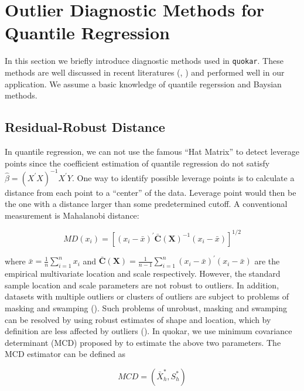 \documentclass[11pt,a4paper,]{article}
\theoremstyle{definition}
\theoremstyle{definition}
\theoremstyle{remark}
\begin{document}
\section{Outlier Diagnostic Methods for Quantile
Regression}\label{outlier-diagnostic-methods-for-quantile-regression}

In this section we briefly introduce diagnostic methods used in
\texttt{quokar}. These methods are well discussed in recent literatures
(\textcite{sanchez2013likelihood}, \textcite{santos2016bayesian}) and
performed well in our application. We assume a basic knowledge of
quantile regerssion and Baysian methods.

\subsection{Residual-Robust Distance}\label{residual-robust-distance}

In quantile regression, we can not use the famous ``Hat Matrix'' to
detect leverage points since the coefficient estimation of quantile
regression do not satisfy \(\hat{\beta}=(X^{'}X)^{-1}X^{'}Y\). One way
to identify possible leverage points is to calculate a distance from
each point to a ``center'' of the data. Leverage point would then be the
one with a distance larger than some predetermined cutoff. A
conventional measurement is Mahalanobi distance:

\begin{equation}
MD(x_i) = [(x_i-\bar{x})^{'}\bar{\boldsymbol{C}}(\boldsymbol{X})^{-1}(x_i-\bar{x})]^{1/2}
\label{eq:distance}
\end{equation}

where \(\bar{x}=\frac{1}{n}\sum_{i=1}^{n}x_i\) and
\(\bar{\boldsymbol{C}}(\boldsymbol{X})=\frac{1}{n-1}\sum_{i=1}^{n}(x_i-\bar{x})^{'}(x_i-\bar{x})\)
are the empirical multivariate location and scale respectively. However,
the standard sample location and scale parameters are not robust to
outliers. In addition, datasets with multiple outliers or clusters of
outliers are subject to problems of masking and swamping
(\textcite{pearson1936efficiency}). Such problems of unrobust, masking
and swamping can be resolved by using robust estimates of shape and
location, which by definition are less affected by outliers
(\textcite{rousseeuw1991robust}). In quokar, we use minimum covariance
determinant (MCD) proposed by \textcite{rousseeuw1999fast} to estimate
the above two parameters. The MCD estimator can be defined as

\begin{equation}
MCD = (\bar{X}^{*}_{h}, S^{*}_{h})
\label{eq: mcd}
\end{equation}
\end{document}

